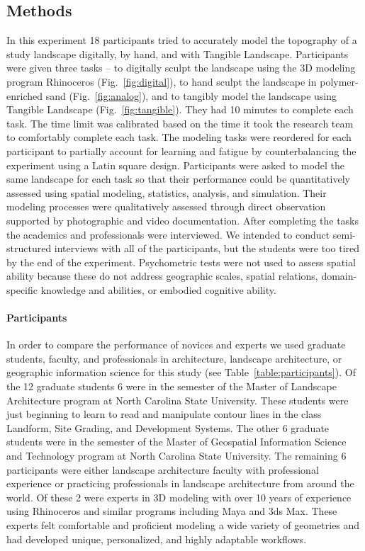 \documentclass[Afour,sagev,times]{sagej} %
\begin{document}
\subsection{Methods}
In this experiment 
18 participants tried to accurately model 
the topography of a study landscape 
digitally, by hand, and with Tangible Landscape. 
Participants were given three tasks -- 
to digitally sculpt the landscape 
using the 3D modeling program Rhinoceros 
(Fig.~\ref{fig:digital}), 
to hand sculpt the landscape in polymer-enriched sand
(Fig.~\ref{fig:analog}), 
and to tangibly model the landscape using Tangible Landscape
(Fig.~\ref{fig:tangible}). 
They had 10 minutes to complete each task. 
The time limit was calibrated based on 
the time it took the research team 
to comfortably complete each task. 
The modeling tasks were reordered for each participant
to partially account for learning and fatigue
by counterbalancing the experiment using a Latin square design.
Participants were asked to model the same landscape for each task 
so that their performance could be quantitatively assessed 
using spatial modeling, statistics, analysis, and simulation.
Their modeling processes were qualitatively assessed 
through direct observation
supported by photographic and video documentation. 
After completing the tasks
the academics and professionals 
were interviewed. 
We intended to conduct semi-structured interviews 
with all of the participants, but
the students were too tired by the end of the experiment. 
Psychometric tests were not used
to assess spatial ability because
these do not address 
geographic scales,
spatial relations,
domain-specific knowledge and abilities,
\cite{Lee2009,Bednarz2011,Wakabayashi2011}
or embodied cognitive ability. 

\paragraph{Participants}
In order to compare the performance of novices and experts
we used graduate students, faculty, and professionals 
in architecture, landscape architecture, or geographic information science
for this study (see Table~\ref{table:participants}).
Of the 12 graduate students 6 were in the  semester of the 
Master of Landscape Architecture program 
at North Carolina State University.
These students were just beginning 
to learn to read and manipulate contour lines 
in the class Landform, Site Grading, and Development Systems. 
The other 6 graduate students were in the  semester of the 
Master of Geospatial Information Science and Technology program 
at North Carolina State University.
The remaining 6 participants were 
either landscape architecture faculty with professional experience 
or practicing professionals in landscape architecture 
from around the world. 
Of these 2 were experts in 3D modeling with over 10 years of experience 
using Rhinoceros and similar programs including Maya and 3ds Max. 
These experts felt comfortable and proficient 
modeling a wide variety of geometries 
and had developed unique, personalized, and highly adaptable workflows.
\end{document}
